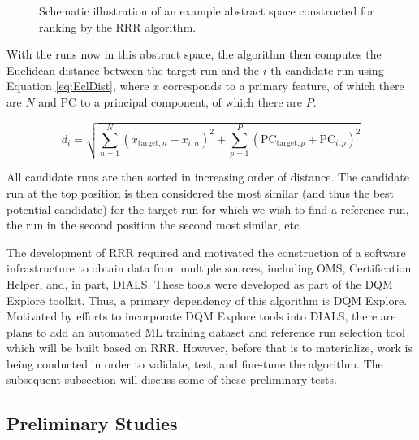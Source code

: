 \begin{figure}
    \centering
    \caption{Schematic illustration of an example abstract space constructed for ranking by the RRR algorithm.}
    \label{fig:RRRspace}
\end{figure}

With the runs now in this abstract space, the algorithm then computes the Euclidean distance between the target run and the $i$-th candidate run using Equation \ref{eq:EclDist}, where $x$ corresponds to a primary feature, of which there are $N$ and $\text{PC}$ to a principal component, of which there are $P$.

\begin{equation}
    d_i = \sqrt{\sum_{n=1}^{N} (x_{\text{target},n} - x_{i,n})^2 +\sum_{p=1}^P (\text{PC}_{\text{target},p} + \text{PC}_{i,p})^2}
    \label{eq:EclDist}
\end{equation}

\noindent All candidate runs are then sorted in increasing order of distance. The candidate run at the top position is then considered the most similar (and thus the best potential candidate) for the target run for which we wish to find a reference run, the run in the second position the second most similar, etc. 

The development of RRR required and motivated the construction of a software infrastructure to obtain data from multiple sources, including OMS, Certification Helper, and, in part, DIALS. These tools were developed as part of the DQM Explore toolkit. Thus, a primary dependency of this algorithm is DQM Explore. Motivated by efforts to incorporate DQM Explore tools into DIALS, there are plans to add an automated ML training dataset and reference run selection tool which will be built based on RRR. However, before that is to materialize, work is being conducted in order to validate, test, and fine-tune the algorithm. The subsequent subsection will discuss some of these preliminary tests.

\subsection{Preliminary Studies}

